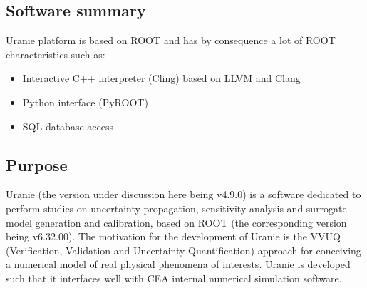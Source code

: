 \subsection{Software summary}
\label{sec:Uranie:summary}

Uranie platform is based on ROOT and has by consequence a lot of ROOT characteristics such as:
\begin{itemize}
    \item Interactive C++ interpreter (Cling) based on LLVM and Clang 
    \item Python interface (PyROOT)
    \item SQL database access 
\end{itemize}


\subsection{Purpose}
\label{sec:Uranie:purpose}

Uranie (the version under discussion here being v4.9.0) is a software dedicated to perform studies on uncertainty propagation, sensitivity analysis and surrogate model generation and calibration, based on ROOT (the corresponding version being v6.32.00). The motivation for the development of Uranie is the VVUQ (Verification, Validation and Uncertainty Quantification) approach for conceiving a numerical model of real physical phenomena of interests. Uranie is developed such that it interfaces well with CEA internal numerical simulation software.


